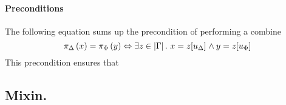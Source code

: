 \paragraph{Preconditions}
The following equation sums up the precondition of performing a combine 
\[
\pi_{\Delta} \left( x \right) = \pi_{\Phi} \left( y \right)
\Leftrightarrow \exists z \in \left| \Gamma \right|.\ x =
z[ u_{\Delta}]_{} \wedge y = z[ u_{\Phi}]_{} \]
This precondition ensures that 


\subsection{Mixin.}
\label{subsec:mixin}

